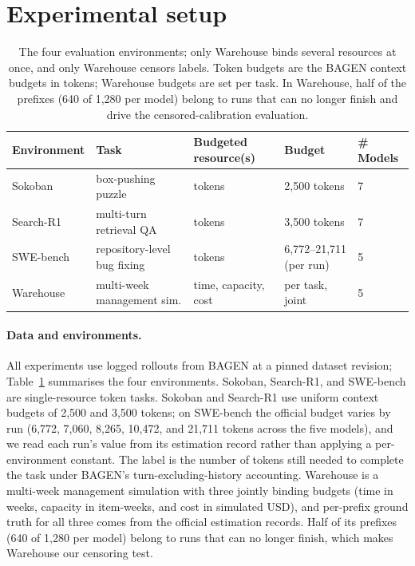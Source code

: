 \documentclass{article}
\begin{document}
\section{Experimental setup}
\label{sec:setup}

\begin{table}[t]
  \caption{The four evaluation environments; only Warehouse binds several resources at
  once, and only Warehouse censors labels. Token budgets are the BAGEN context budgets
  in tokens; Warehouse budgets are set per task. In Warehouse, half of the prefixes
  (640 of 1,280 per model) belong to runs that can no longer finish and drive the
  censored-calibration evaluation.}
  \label{tab:envs}
  \centering
  \small
  \begin{tabular}{lllll}
    \toprule
    Environment & Task & Budgeted resource(s) & Budget & \# Models \\
    \midrule
    Sokoban   & box-pushing puzzle          & tokens               & 2,500 tokens & 7 \\
    Search-R1 & multi-turn retrieval QA     & tokens               & 3,500 tokens & 7 \\
    SWE-bench & repository-level bug fixing & tokens               & 6,772--21,711 (per run) & 5 \\
    Warehouse & multi-week management sim.  & time, capacity, cost & per task, joint & 5 \\
    \bottomrule
  \end{tabular}
\end{table}

\paragraph{Data and environments.} All experiments use logged rollouts from BAGEN
\cite{lin2026bagen} at a pinned dataset revision; Table~\ref{tab:envs} summarises the
four environments. Sokoban, Search-R1, and SWE-bench are single-resource token tasks.
Sokoban and Search-R1 use uniform context budgets of 2,500 and 3,500 tokens; on
SWE-bench the official budget varies by run (6,772, 7,060, 8,265, 10,472, and 21,711
tokens across the five models), and we read each run's value from its estimation record
rather than applying a per-environment constant. The label is the number of tokens
still needed to complete the task under BAGEN's turn-excluding-history accounting.
Warehouse is a multi-week management simulation with three jointly binding budgets
(time in weeks, capacity in item-weeks, and cost in simulated USD), and per-prefix
ground truth for all three comes from the official estimation records. Half of its
prefixes (640 of 1,280 per model) belong to runs that can no longer finish, which makes
Warehouse our censoring test.
\end{document}
